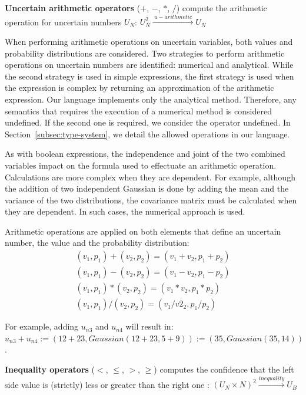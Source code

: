 \bigskip

\begin{operator}
    \label{op:arithmetic}
    \textbf{Uncertain arithmetic operators} ($+$, $-$, $*$, $/$) compute the arithmetic operation for uncertain numbers $U_N$: $U_N^2 \xrightarrow{~u-arithmetic~} U_N$
\end{operator}
When performing arithmetic operations on uncertain variables, both values and probability distributions are considered.
Two strategies to perform arithmetic operations on uncertain numbers are identified: numerical and analytical.
While the second strategy is used in simple expressions, the first strategy is used when the expression is complex by returning an approximation of the arithmetic expression. 
Our language implements only the analytical method.
Therefore, any semantics that requires the execution of a numerical method is considered undefined.
If the second one is required, we consider the operator undefined.
In Section~\ref{subsec:type-system}, we detail the allowed operations in our language.

As with boolean expressions, the independence and joint of the two combined variables impact on the formula used to effectuate an arithmetic operation.
Calculations are more complex when they are dependent.
For example, although the addition of two independent Gaussian is done by adding the mean and the variance of the two distributions, the covariance matrix must be calculated when they are dependent.
In such cases, the numerical approach is used.

Arithmetic operations are applied on both elements that define an uncertain number, the value and the probability distribution:
\begin{align*}
	(v_1,p_1) + (v_2,p_2) = (v_1 + v_2, p_1 + p_2)\\
	(v_1,p_1) - (v_2,p_2) = (v_1 - v_2, p_1 - p_2)\\
	(v_1,p_1) * (v_2,p_2) = (v_1 * v_2, p_1 * p_2)\\
	(v_1,p_1) / (v_2,p_2) = (v_1 / v2_2, p_1 / p_2)
\end{align*}

For example, adding $u_{n3}$ and $u_{n4}$ will result in: $u_{n3} + u_{n4} := (12+23, Gaussian(12+23, 5+9)) := (35, Gaussian(35, 14))$.

\bigskip

\begin{operator}
	\label{op:inequality}
	\textbf{Inequality operators} ($<$, $\leqslant$, $>$, $\geqslant$) computes the confidence that the left side value is (strictly) less or greater than the right one : $(U_N \times N)^2 \xrightarrow{inequality} U_B$
\end{operator}

